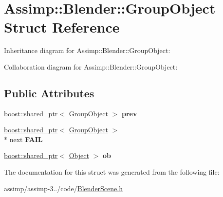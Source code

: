 \hypertarget{struct_assimp_1_1_blender_1_1_group_object}{\section{Assimp\+:\+:Blender\+:\+:Group\+Object Struct Reference}
\label{struct_assimp_1_1_blender_1_1_group_object}
}


Inheritance diagram for Assimp\+:\+:Blender\+:\+:Group\+Object\+:


Collaboration diagram for Assimp\+:\+:Blender\+:\+:Group\+Object\+:
\subsection*{Public Attributes}
\begin{DoxyCompactItemize}
\item 
\hypertarget{struct_assimp_1_1_blender_1_1_group_object_a81cc3a268802f281cc50ea743d760139}{\hyperlink{classboost_1_1shared__ptr}{boost\+::shared\+\_\+ptr}$<$ \hyperlink{struct_assimp_1_1_blender_1_1_group_object}{Group\+Object} $>$ {\bfseries prev}}\label{struct_assimp_1_1_blender_1_1_group_object_a81cc3a268802f281cc50ea743d760139}

\item 
\hypertarget{struct_assimp_1_1_blender_1_1_group_object_adb1c61fc235128c4cac0d6c855de9f27}{\hyperlink{classboost_1_1shared__ptr}{boost\+::shared\+\_\+ptr}$<$ \hyperlink{struct_assimp_1_1_blender_1_1_group_object}{Group\+Object} $>$\\*
 next {\bfseries F\+A\+I\+L}}\label{struct_assimp_1_1_blender_1_1_group_object_adb1c61fc235128c4cac0d6c855de9f27}

\item 
\hypertarget{struct_assimp_1_1_blender_1_1_group_object_a414b1ad233125170d83d03a246f1f052}{\hyperlink{classboost_1_1shared__ptr}{boost\+::shared\+\_\+ptr}$<$ \hyperlink{struct_assimp_1_1_blender_1_1_object}{Object} $>$ {\bfseries ob}}\label{struct_assimp_1_1_blender_1_1_group_object_a414b1ad233125170d83d03a246f1f052}

\end{DoxyCompactItemize}


The documentation for this struct was generated from the following file\+:\begin{DoxyCompactItemize}
\item 
assimp/assimp-\/3../code/\hyperlink{_blender_scene_8h}{Blender\+Scene.\+h}\end{DoxyCompactItemize}
